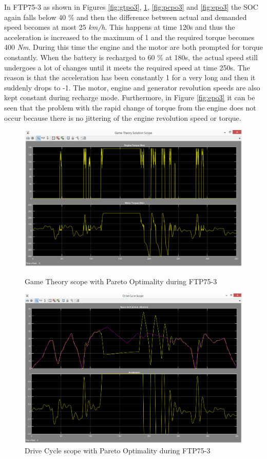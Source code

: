 In FTP75-3 as shown in Figures \ref{fig:gtpo3}, \ref{fig:dcpo3}, \ref{fig:pcpo3} and \ref{fig:epo3} the SOC again falls below 40 \% and then the difference between actual and demanded speed becomes at most 25 \textit{km/h}. This happens at time 120s and thus the acceleration is increased to the maximum of 1 and the required torque becomes 400 \textit{Nm}. During this time the engine and the motor are both prompted for torque constantly. When the battery is recharged to 60 \% at 180s, the actual speed still undergoes a lot of changes until it meets the required speed at time 250s. The reason is that the acceleration has been constantly 1 for a very long and then it suddenly drops to -1. The motor, engine and generator revolution speeds are also kept constant during recharge mode. Furthermore, in Figure \ref{fig:epo3} it can be seen that the problem with the rapid change of torque from the engine does not occur because there is no jittering of the engine revolution speed or torque.

\begin{figure}[hp]
\centering
\includegraphics[scale=0.45]{figures/Pareto/FTP75-3/gameTheory08Juni}
\caption{Game Theory scope with Pareto Optimality during FTP75-3}
\label{fig:gtpo3}
\includegraphics[scale=0.41]{figures/Pareto/FTP75-3/driveCycle08Juni}
\caption{Drive Cycle scope with Pareto Optimality during FTP75-3}
\label{fig:dcpo3}
\end{figure}

